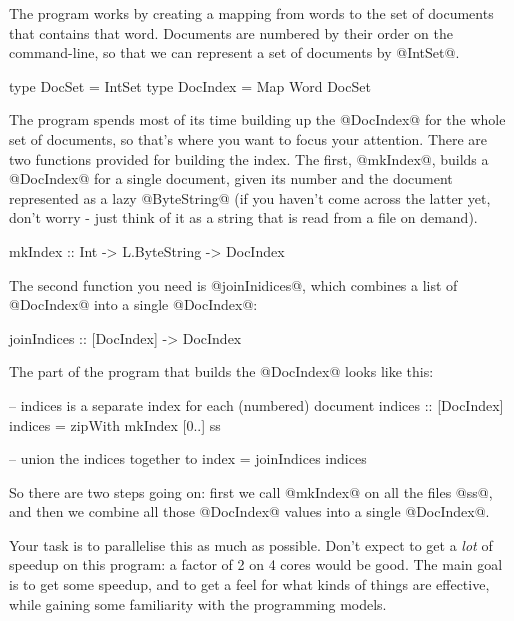 \documentclass[11pt,a4paper]{article}
\begin{document}
The program works by creating a mapping from words to the set of
documents that contains that word.  Documents are numbered by their
order on the command-line, so that we can represent a set of documents
by @IntSet@.

\begin{haskell}
type DocSet = IntSet
type DocIndex = Map Word DocSet
\end{haskell}

The program spends most of its time building up the @DocIndex@ for the
whole set of documents, so that's where you want to focus your
attention.  There are two functions provided for building the index.
The first, @mkIndex@, builds a @DocIndex@ for a single document, given
its number and the document represented as a lazy @ByteString@ (if you
haven't come across the latter yet, don't worry - just think of it as
a string that is read from a file on demand).

\begin{haskell}
mkIndex :: Int -> L.ByteString -> DocIndex
\end{haskell}

The second function you need is @joinInidices@, which combines a list
of @DocIndex@ into a single @DocIndex@:

\begin{haskell}
joinIndices :: [DocIndex] -> DocIndex
\end{haskell}

The part of the program that builds the @DocIndex@ looks like this:

\begin{haskell}
      -- indices is a separate index for each (numbered) document
      indices :: [DocIndex]
      indices = zipWith mkIndex [0..] ss

      -- union the indices together to
      index = joinIndices indices
\end{haskell}

So there are two steps going on: first we call @mkIndex@ on all the
files @ss@, and then we combine all those @DocIndex@ values into a
single @DocIndex@.

Your task is to parallelise this as much as possible.  Don't expect to
get a \emph{lot} of speedup on this program: a factor of 2 on 4 cores
would be good.  The main goal is to get some speedup, and to get a
feel for what kinds of things are effective, while gaining some
familiarity with the programming models.
\end{document}
